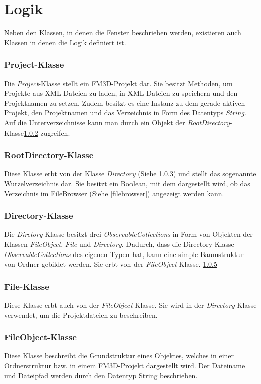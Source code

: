\section{Logik}
Neben den Klassen, in denen die Fenster beschrieben werden, existieren auch Klassen in denen die Logik definiert ist. 

\subsubsection{Project-Klasse}
Die \textit{Project}-Klasse stellt ein FM3D-Projekt dar. Sie besitzt Methoden, um Projekte aus \ac{XML}-Dateien zu laden, in \ac{XML}-Dateien zu speichern und den Projektnamen zu setzen. Zudem besitzt es eine Instanz zu dem gerade aktiven Projekt, den Projektnamen und das Verzeichnis in Form des Datentyps \textit{String}. Auf die Unterverzeichnisse kann man durch ein Objekt der \textit{RootDirectory}-Klasse\cref{rootdirectory} zugreifen.

\subsubsection{RootDirectory-Klasse}
\label{rootdirectory}
Diese Klasse erbt von der Klasse \textit{Directory} (Siehe \cref{directory}) und stellt das sogenannte Wurzelverzeichnis dar. Sie besitzt ein Boolean, mit dem dargestellt wird, ob das Verzeichnis im FileBrowser (Siehe \cref{filebrowser}) angezeigt werden kann.

\subsubsection{Directory-Klasse}
\label{directory}
Die \textit{Diretory}-Klasse besitzt drei \textit{ObservableCollections} in Form von Objekten der Klassen \textit{FileObject}, \textit{File} und \textit{Directory}. Dadurch, dass die Directory-Klasse \textit{ObservableCollections} des eigenen Typen hat, kann eine simple Baumstruktur von Ordner gebildet werden. Sie erbt von der \textit{FileObject}-Klasse. \cref{fileobject}

\subsubsection{File-Klasse}
Diese Klasse erbt auch von der \textit{FileObject}-Klasse. Sie wird in der \textit{Directory}-Klasse verwendet, um die Projektdateien zu beschreiben.

\subsubsection{FileObject-Klasse}
\label{fileobject}
Diese Klasse beschreibt die Grundstruktur eines Objektes, welches in einer Ordnerstruktur bzw. in einem FM3D-Projekt dargestellt wird. Der Dateiname und Dateipfad werden durch den Datentyp String beschrieben.

